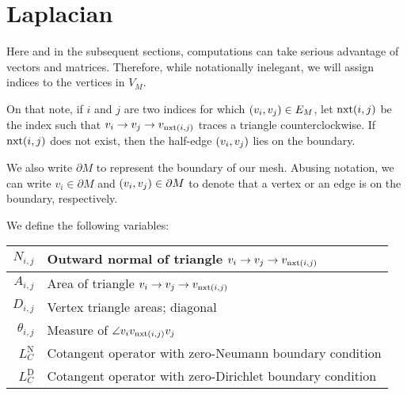 \section{Laplacian}

Here and in the subsequent sections, computations can take serious advantage of vectors and matrices. Therefore, while notationally inelegant, we will assign indices to the vertices in \(V_M\).

On that note, if \(i\) and \(j\) are two indices for which \(\pof{v_i, v_j} \in E_M\), let \(\nxt\pof{i, j}\) be the index such that \(v_i \to v_j \to v_{\nxt\pof{i, j}}\) traces a triangle counterclockwise. If \(\nxt\pof{i, j}\) does not exist, then the half-edge \(\pof{v_i, v_j}\) lies on the boundary.

We also write \(\partial M\) to represent the boundary of our mesh. Abusing notation, we can write \(v_i \in \partial M\) and \(\pof{v_i, v_j} \in \partial M\) to denote that a vertex or an edge is on the boundary, respectively.

We define the following variables: \begin{center}\begin{tabular}{r|l}
	\(N_{i, j}\) & Outward normal of triangle \(v_i \to v_j \to v_{\nxt\pof{i, j}}\) \\ \hline
	\(A_{i, j}\) & Area of triangle \(v_i \to v_j \to v_{\nxt\pof{i, j}}\) \\ \hline
	\(D_{i, j}\) & Vertex triangle areas; diagonal \\ \hline
	\(\theta_{i, j}\) & Measure of \(\angle v_iv_{\nxt\pof{i, j}}v_j\) \\ \hline
	\(L_C^{\text{N}}\) & Cotangent operator with zero-Neumann boundary condition \\ \hline
	\(L_C^{\text{D}}\) & Cotangent operator with zero-Dirichlet boundary condition
\end{tabular}\end{center}

